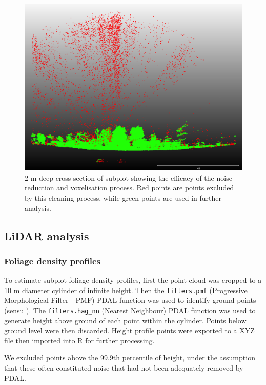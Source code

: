 \documentclass[11pt,a4paper]{article}
\begin{document}
\begin{figure}[H]
\centering
	\includegraphics[width=\textwidth]{noise_vis}
	\caption{2 m deep cross section of subplot showing the efficacy of the noise reduction and voxelisation process. Red points are points excluded by this cleaning process, while green points are used in further analysis.}
	\label{noise_vis}
\end{figure}


\subsection{LiDAR analysis}

\subsubsection{Foliage density profiles}

To estimate subplot foliage density profiles, first the point cloud was cropped to a 10 m diameter cylinder of infinite height. Then the \texttt{filters.pmf} (Progressive Morphological Filter - PMF) PDAL function was used to identify ground points (sensu \citealt{Zhang2003}). The \texttt{filters.hag\_nn} (Nearest Neighbour) PDAL function was used to generate height above ground of each point within the cylinder. Points below ground level were then discarded. Height profile points were exported to a XYZ file then imported into R for further processing. 

We excluded points above the 99.9th percentile of height, under the assumption that these often constituted noise that had not been adequately removed by PDAL.
\end{document}
